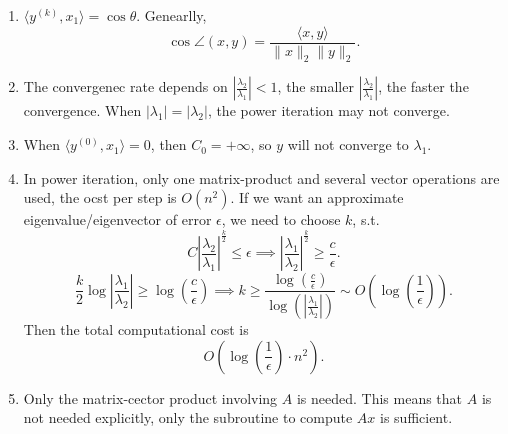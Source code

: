 \documentclass[../main/main.tex]{subfiles}
\begin{document}
\begin{remark}
	\begin{enumerate}
		\item $\langle y^{(k)}, x_1\rangle=\cos \theta$. Genearlly,  \[
				\cos \angle(x,y) = \frac{\langle x,y\rangle}{\|x\|_2\|y\|_2}
		.\] 
	\item The convergenec rate depends on $\left| \frac{\lambda_2}{\lambda_1} \right| <1$, the smaller $\left| \frac{\lambda_2}{\lambda_1} \right| $, the faster the convergence. When $|\lambda_1|=|\lambda_2|$, the power iteration may not converge.
	\item When $\langle y^{(0)},x_1\rangle=0$, then $C_0=+\infty$, so $y$ will not converge to  $\lambda_1$.
	\item In power iteration, only one matrix-product and several vector operations are used, the ocst per step is $O(n^2)$. If we want an approximate eigenvalue/eigenvector of error $\epsilon$, we need to choose $k$, s.t. \[
	C\left| \frac{\lambda_2}{\lambda_1} \right| ^{\frac{k}{2}}\le \epsilon\implies\left| \frac{\lambda_1}{\lambda_2} \right| ^{\frac{k}{2}}\ge \frac{c}{\epsilon}
	.\] \[
	\frac{k}{2}\log\left| \frac{\lambda_1}{\lambda_2} \right| \ge \log\left( \frac{c}{\epsilon} \right) \implies k\ge \frac{\log\left( \frac{c}{\epsilon} \right) }{\log\left( \left| \frac{\lambda_1}{\lambda_2} \right|  \right) }\sim O\left( \log\left( \frac{1}{\epsilon} \right)  \right) 
	.\] Then the total computational cost is \[
	O\left( \log\left( \frac{1}{\epsilon} \right)\cdot n^2 \right)
	.\] 
\item Only the matrix-cector product involving $A $ is needed. This means that $A$ is not needed explicitly, only the subroutine to compute  $Ax$ is sufficient.
	\end{enumerate}
\end{remark}
\end{document}
